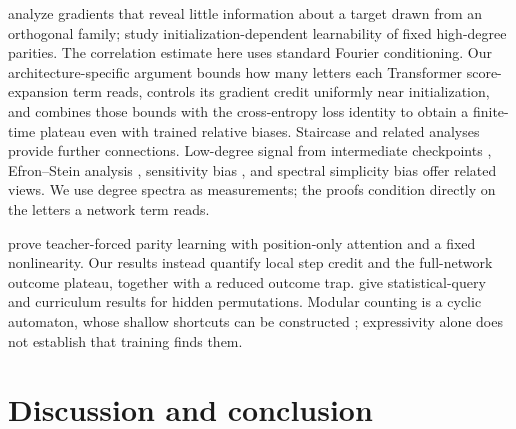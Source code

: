 \citet{shalevshwartz2017failures} analyze gradients that reveal little information
about a target drawn from an orthogonal family; \citet{abbe2025parities} study
initialization-dependent learnability of fixed high-degree parities.
The correlation estimate here uses standard Fourier conditioning. Our architecture-specific
argument bounds how many letters each Transformer score-expansion term reads, controls
its gradient credit uniformly near initialization, and combines those bounds with the
cross-entropy loss identity to obtain a finite-time plateau even with trained relative biases.
Staircase and related analyses
\citep{abbe2021staircase,abbe2022mergedstaircase,abbe2023sgd} provide further connections.
Low-degree signal from intermediate checkpoints \citep{panigrahi2025progressive}, Efron--Stein
analysis \citep{li2025noise}, sensitivity bias \citep{hahn2024sensitive}, and spectral simplicity
bias \citep{yang2019spectral} offer related views. We use degree spectra as measurements;
the proofs condition directly on the letters a network term reads.

\citet{kim2024parity} prove teacher-forced parity learning with position-only attention and a fixed
nonlinearity. Our results instead quantify local step credit and the full-network
outcome plateau, together with a reduced outcome trap. \citet{wang2025compositional} give statistical-query
and curriculum results for hidden permutations. Modular counting is a cyclic automaton,
whose shallow shortcuts can be constructed \citep{liu2023automata}; expressivity alone does
not establish that training finds them.

\section{Discussion and conclusion}
\label{sec:conclusion}
\label{sec:discussion}

